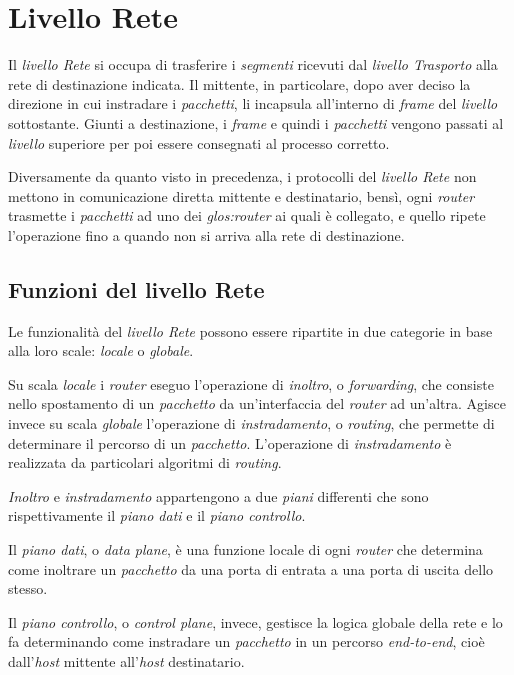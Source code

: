 \chapter{Livello Rete}
Il \emph{livello Rete} si occupa di trasferire i \emph{segmenti} ricevuti dal
\emph{livello Trasporto} alla rete di destinazione indicata. Il mittente, in
particolare, dopo aver deciso la direzione in cui instradare i
\emph{pacchetti}, li incapsula all'interno di \emph{frame} del \emph{livello}
sottostante. Giunti a destinazione, i \emph{frame} e quindi i \emph{pacchetti}
vengono passati al \emph{livello} superiore per poi essere consegnati al
processo corretto.

Diversamente da quanto visto in precedenza, i protocolli del \emph{livello Rete}
non mettono in comunicazione diretta mittente e destinatario, bensì, ogni
\emph{router} trasmette i \emph{pacchetti} ad uno dei \emph{\gls{glos:router}}
ai quali è collegato, e quello ripete l'operazione fino a quando non si arriva
alla rete di destinazione.

\section{Funzioni del livello Rete}
Le funzionalità del \emph{livello Rete} possono essere ripartite in due categorie
in base alla loro scale: \emph{locale} o \emph{globale}.

Su scala \emph{locale} i \emph{router} eseguo l'operazione di \emph{inoltro},
o \emph{forwarding}, che consiste nello spostamento di un \emph{pacchetto} da
un'interfaccia del \emph{router} ad un'altra. Agisce invece su scala
\emph{globale} l'operazione di \emph{instradamento}, o \emph{routing}, che
permette di determinare il percorso di un \emph{pacchetto}. L'operazione di
\emph{instradamento} è realizzata da particolari algoritmi di \emph{routing}.

\bigskip\noindent
\emph{Inoltro} e \emph{instradamento} appartengono a due
\emph{piani} differenti che sono rispettivamente il \emph{piano dati} e il
\emph{piano controllo}.

Il \emph{piano dati}, o \emph{data plane}, è una funzione locale di ogni
\emph{router} che determina come inoltrare un \emph{pacchetto} da una porta di
entrata a una porta di uscita dello stesso.

Il \emph{piano controllo}, o \emph{control plane}, invece, gestisce la
logica globale della rete e lo fa determinando come instradare un
\emph{pacchetto} in un percorso \emph{end-to-end}, cioè dall'\emph{host}
mittente all'\emph{host} destinatario.

